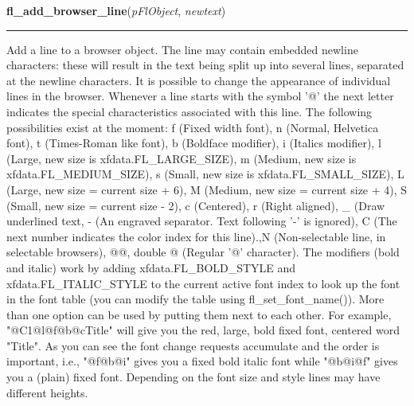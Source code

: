     \label{xformslib:flbrowser:fl_add_browser_line}

    \vspace{0.5ex}

\hspace{.8\funcindent}\begin{boxedminipage}{\funcwidth}

    \raggedright \textbf{fl\_add\_browser\_line}(\textit{pFlObject}, \textit{newtext})

    \vspace{-1.5ex}

    \rule{\textwidth}{0.5\fboxrule}
\setlength{\parskip}{2ex}
    Add a line to a browser object. The line may contain embedded newline 
    characters: these will result in the text being split up into several 
    lines, separated at the newline characters. It is possible to change 
    the appearance of individual lines in the browser. Whenever a line 
    starts with the symbol '@' the next letter indicates the special 
    characteristics associated with this line. The following possibilities 
    exist at the moment: f (Fixed width font), n (Normal, Helvetica font), 
    t (Times-Roman like font), b (Boldface modifier), i (Italics modifier),
    l (Large, new size is xfdata.FL\_LARGE\_SIZE), m (Medium, new size is 
    xfdata.FL\_MEDIUM\_SIZE), s (Small, new size is 
    xfdata.FL\_SMALL\_SIZE), L (Large, new size = current size + 6), M 
    (Medium, new size = current size + 4), S (Small, new size = current 
    size - 2), c (Centered), r (Right aligned), \_ (Draw underlined text, -
    (An engraved separator. Text following '-' is ignored), C (The next 
    number indicates the color index for this line).,N (Non-selectable 
    line, in selectable browsers), @@, double @ (Regular '@' character). 
    The modifiers (bold and italic) work by adding xfdata.FL\_BOLD\_STYLE 
    and xfdata.FL\_ITALIC\_STYLE to the current active font index to look 
    up the font in the font table (you can modify the table using 
    fl\_set\_font\_name()). More than one option can be used by putting 
    them next to each other. For example, "@C1@l@f@b@cTitle" will give you 
    the red, large, bold fixed font, centered word "Title". As you can see 
    the font change requests accumulate and the order is important, i.e., 
    "@f@b@i" gives you a fixed bold italic font while "@b@i@f" gives you a 
    (plain) fixed font. Depending on the font size and style lines may have
    different heights.


\end{boxedminipage}
